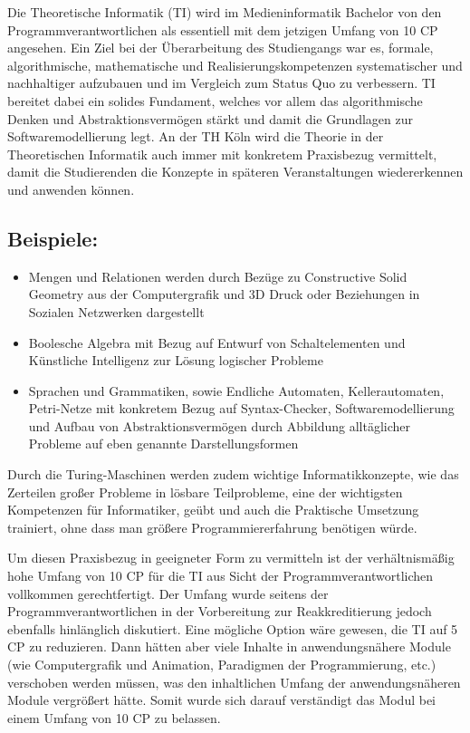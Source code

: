 Die Theoretische Informatik (TI) wird im Medieninformatik Bachelor von
den Programmverantwortlichen als essentiell mit dem jetzigen Umfang von
10 CP angesehen. Ein Ziel bei der Überarbeitung des Studiengangs war es,
formale, algorithmische, mathematische und Realisierungskompetenzen
systematischer und nachhaltiger aufzubauen und im Vergleich zum Status
Quo zu verbessern. TI bereitet dabei ein solides Fundament, welches vor
allem das algorithmische Denken und Abstraktionsvermögen stärkt und
damit die Grundlagen zur Softwaremodellierung legt. An der TH Köln wird
die Theorie in der Theoretischen Informatik auch immer mit konkretem
Praxisbezug vermittelt, damit die Studierenden die Konzepte in späteren
Veranstaltungen wiedererkennen und anwenden können.

\subsection{Beispiele:\label{/mi-2017/selbstbericht/stellungnahme/0000-stellungnahme}}\label{beispielepathlabelmi-2017selbstberichtstellungnahme0000-stellungnahme}

\begin{itemize}
\tightlist
\item
  Mengen und Relationen werden durch Bezüge zu Constructive Solid
  Geometry aus der Computergrafik und 3D Druck oder Beziehungen in
  Sozialen Netzwerken dargestellt
\item
  Boolesche Algebra mit Bezug auf Entwurf von Schaltelementen und
  Künstliche Intelligenz zur Lösung logischer Probleme
\item
  Sprachen und Grammatiken, sowie Endliche Automaten, Kellerautomaten,
  Petri-Netze mit konkretem Bezug auf Syntax-Checker,
  Softwaremodellierung und Aufbau von Abstraktionsvermögen durch
  Abbildung alltäglicher Probleme auf eben genannte Darstellungsformen
\end{itemize}

Durch die Turing-Maschinen werden zudem wichtige Informatikkonzepte, wie
das Zerteilen großer Probleme in lösbare Teilprobleme, eine der
wichtigsten Kompetenzen für Informatiker, geübt und auch die Praktische
Umsetzung trainiert, ohne dass man größere Programmiererfahrung
benötigen würde.

Um diesen Praxisbezug in geeigneter Form zu vermitteln ist der
verhältnismäßig hohe Umfang von 10 CP für die TI aus Sicht der
Programmverantwortlichen vollkommen gerechtfertigt. Der Umfang wurde
seitens der Programmverantwortlichen in der Vorbereitung zur
Reakkreditierung jedoch ebenfalls hinlänglich diskutiert. Eine mögliche
Option wäre gewesen, die TI auf 5 CP zu reduzieren. Dann hätten aber
viele Inhalte in anwendungsnähere Module (wie Computergrafik und
Animation, Paradigmen der Programmierung, etc.) verschoben werden
müssen, was den inhaltlichen Umfang der anwendungsnäheren Module
vergrößert hätte. Somit wurde sich darauf verständigt das Modul bei
einem Umfang von 10 CP zu belassen.

